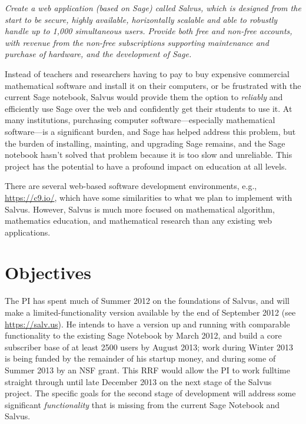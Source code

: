 \documentclass[11pt]{article}
\begin{document}
 {\em Create a web application (based on Sage)
  called Salvus, which is designed from the start to be secure, highly
  available, horizontally scalable and able to robustly handle up to
  1,000 simultaneous users.  Provide both free and non-free accounts,
  with revenue from the non-free subscriptions supporting maintenance
  and purchase of hardware, and the development of Sage.}

Instead of teachers and researchers having to pay to buy expensive
commercial mathematical software and install it on their computers, or
be frustrated with the current Sage notebook, Salvus would provide
them the option to {\em reliably} and efficiently use Sage over the
web and confidently get their students to use it.  At many
institutions, purchasing computer software---especially mathematical
software---is a significant burden, and Sage has helped address this
problem, but the burden of installing, mainting, and upgrading Sage
remains, and the Sage notebook hasn't solved that problem because it
is too slow and unreliable.  This project has the potential to have a
profound impact on education at all levels.

There are several web-based software development environments, e.g.,
\url{https://c9.io/}, which have some similarities to what we plan to
implement with Salvus.  However, Salvus is much more focused on
mathematical algorithm, mathematics education, and
mathematical research than any existing web applications.

\section{Objectives}

The PI has spent much of Summer 2012 on the foundations of Salvus, and
will make a limited-functionality version available by the end of
September 2012 (see \url{https://salv.us}).  He intends to have a
version up and running with comparable functionality to the existing
Sage Notebook by March 2012, and build a core subscriber base of at
least 2500 users by August 2013; work during Winter 2013 is being
funded by the remainder of his startup money, and during some of
Summer 2013 by an NSF grant.  This RRF would allow the PI to work
fulltime straight through until late December 2013 on the next stage
of the Salvus project. The specific goals for the second stage of
development will address some significant {\em functionality} that is
missing from the current Sage Notebook and Salvus.
\end{document}

